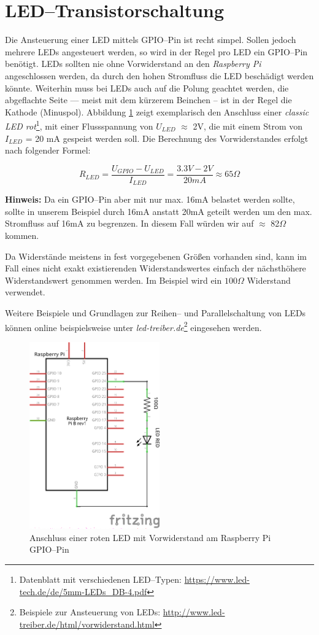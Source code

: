 \documentclass[11pt,ngerman,toc=listof,index=totoc]{scrreprt}
\begin{document}
\section{LED--Transistorschaltung}\label{ledtransistorschaltung}

Die Ansteuerung einer LED mittels GPIO--Pin ist recht simpel. Sollen
jedoch mehrere LEDs angesteuert werden, so wird in der Regel pro LED ein
GPIO--Pin benötigt. LEDs sollten nie ohne Vorwiderstand an den
\emph{Raspberry Pi} angeschlossen werden, da durch den hohen Stromfluss
die LED beschädigt werden könnte. Weiterhin muss bei LEDs auch auf die
Polung geachtet werden, die abgeflachte Seite --- meist mit dem kürzerem
Beinchen -- ist in der Regel die Kathode (Minuspol). Abbildung \ref{led}
zeigt exemplarisch den Anschluss einer \emph{classic LED rot}\footnote{Datenblatt
  mit verschiedenen LED--Typen:
  \url{https://www.led-tech.de/de/5mm-LEDs_DB-4.pdf}}, mit einer
Flussspannung von \(U_{LED}\) \(\approx\) 2V, die mit einem Strom von
\(I_{LED}\) = 20 mA gespeist werden soll. Die Berechnung des
Vorwiderstandes erfolgt nach folgender Formel:

\[R_{LED} = \frac{U_{GPIO}-U_{LED}}{I_{LED}} = \frac{3.3V - 2V}{20mA}   \approx 65\Omega\]

\textbf{Hinweis:} Da ein GPIO--Pin aber mit nur max. 16mA belastet
werden sollte, sollte in unserem Beispiel durch 16mA anstatt 20mA
geteilt werden um den max. Stromfluss auf 16mA zu begrenzen. In diesem
Fall würden wir auf \(\approx\) 82\(\Omega\) kommen.

Da Widerstände meistens in fest vorgegebenen Größen vorhanden sind, kann
im Fall eines nicht exakt existierenden Widerstandswertes einfach der
nächsthöhere Widerstandswert genommen werden. Im Beispiel wird ein
\(100\Omega\) Widerstand verwendet.

Weitere Beispiele und Grundlagen zur Reihen-- und Parallelschaltung von
LEDs können online beispielsweise unter \emph{led-treiber.de}\footnote{Beispiele
  zur Ansteuerung von LEDs:
  \url{http://www.led-treiber.de/html/vorwiderstand.html}} eingesehen
werden.

\begin{figure}[h!]
  \centering
\includegraphics[width=0.5\textwidth]{images/led.png}
  \caption{Anschluss einer roten LED mit Vorwiderstand am Raspberry Pi GPIO--Pin}
  \label{led}
\end{figure}
\end{document}
